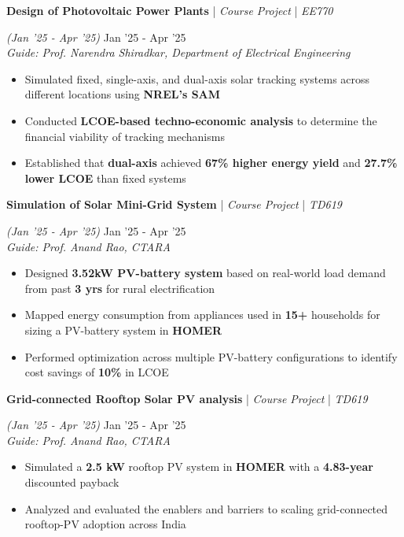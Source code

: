 \documentclass[10pt]{article}
\renewcommand{\subsection}[5]{
	\def\temp{#4}
	\vspace{2pt}
	{
		\large
		{\textbf{#1}} | {\sl #2} | {\sl #3} \filldate{#4}
		\ifx\temp\empty
		\else
		{
			\\[0.1em]
			\fontsize{11}{13.2}\selectfont
			\sl #5
		}
		\fi
	}
}
\newcommand{\filldate}[1]{\strut\hfill {\small \textit{(#1)}}}
\begin{document}
\subsection{Design of Photovoltaic Power Plants}{Course Project}{EE770}{Jan '25 - Apr '25}{Guide: Prof. Narendra Shiradkar, Department of Electrical Engineering}
\begin{itemize}
	\item Simulated fixed, single-axis, and dual-axis solar tracking systems across different locations using \textbf{NREL's SAM}
	\item Conducted \textbf{LCOE-based techno-economic analysis} to determine the financial viability of tracking mechanisms
	\item Established that \textbf{dual-axis} achieved \textbf{67\% higher energy yield} and \textbf{27.7\% lower LCOE} than fixed systems
\end{itemize}

\subsection{Simulation of Solar Mini-Grid System}{Course Project}{TD619}{Jan '25 - Apr '25}{Guide: Prof. Anand Rao, CTARA}
\begin{itemize}
	\item Designed \textbf{3.52kW PV-battery system} based on real-world load demand from past \textbf{3 yrs} for rural electrification 
	\item Mapped energy consumption from appliances used in \textbf{15+} households for sizing a PV-battery system in \textbf{HOMER}
	\item Performed optimization across multiple PV-battery configurations to identify cost savings of \textbf{10\%} in LCOE
\end{itemize}

\subsection{Grid-connected Rooftop Solar PV analysis}{Course Project}{TD619}{Jan '25 - Apr '25}{Guide: Prof. Anand Rao, CTARA}
\begin{itemize}
	\item Simulated a \textbf{2.5 kW} rooftop PV system in \textbf{HOMER} with a \textbf{4.83-year} discounted payback
	\item Analyzed and evaluated the enablers and barriers to scaling grid-connected rooftop-PV adoption across India
\end{itemize}
\end{document}
